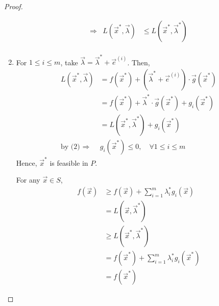 \documentclass[11pt,a4paper]{article}
\begin{document}
\begin{proof}
\begin{enumerate}[$\bullet$]
\begin{equation}
\begin{aligned}
               &\Rightarrow& L(\vec{x}^*,\vec{\lambda})&\leq L(\vec{x}^*,\vec{\lambda}^*)&\\
            \end{aligned}
            \nonumber
        \end{equation}
        \item For $1\leq i\leq m$, take $\vec{\lambda}=\vec{\lambda}^*+\vec{e}^{(i)}$. Then,
        \begin{equation}
            \begin{aligned}
                L(\vec{x}^*,\vec{\lambda})&=f(\vec{x}^*)+\left(\vec{\lambda}^*+\vec{e}^{(i)}\right)\cdot \vec{g}(\vec{x}^*)\\
                &=f(\vec{x}^*)+\vec{\lambda}^*\cdot \vec{g}(\vec{x}^*)+ g_i(\vec{x}^*)\\
                &=L(\vec{x}^*,\vec{\lambda}^*)+g_i(\vec{x}^*)\\
                \text{by (2) }\Rightarrow\ &g_i(\vec{x}^*)\leq 0,\quad \forall 1\leq i\leq m
            \end{aligned}
            \nonumber
        \end{equation}
        Hence, $\vec{x}^*$ is feasible in $P$.

        For any $\vec{x}\in S$,
        \begin{equation}
            \begin{aligned}
                f(\vec{x})&\geq f(\vec{x})+\sum_{i=1}^m\lambda_i^* g_i(\vec{x})\\
                &=L(\vec{x},\vec{\lambda}^*)\\
                &\geq L(\vec{x}^*,\vec{\lambda}^*)\\
                &=f(\vec{x}^*)+\sum_{i=1}^m\lambda_i^* g_i(\vec{x}^*)\\
                &=f(\vec{x}^*)
            \end{aligned}
            \nonumber
        \end{equation}
    \end{enumerate}
\end{proof}
\end{document}
